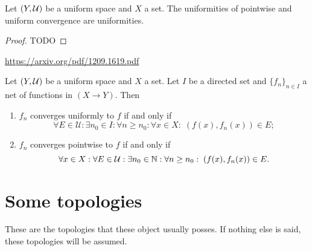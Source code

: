 \begin{lemma}
Let $\left( Y,\mathcal{U} \right)$ be a uniform space and $X$ a set. The uniformities of pointwise and uniform convergence are uniformities.
\end{lemma}
\begin{proof}
TODO
\end{proof}

\url{https://arxiv.org/pdf/1209.1619.pdf}

\begin{proposition}
Let $\left( Y,\mathcal{U} \right)$ be a uniform space and $X$ a set. Let $I$ be a directed set and $\{f_n\}_{n\in I}$ a net of functions in $(X\to Y)$. Then
\begin{enumerate}
\item $f_n$ converges uniformly to $f$ \textup{if and only if}
\[ \forall E\in\mathcal{U}: \exists n_0\in I: \forall n \geq n_0: \forall x\in X: \; (f(x), f_n(x)) \in E; \]
\item $f_n$ converges pointwise to $f$ \textup{if and only if}
\[ \forall x\in X: \forall E\in \mathcal{U}: \exists n_0\in \mathbb{N}: \forall n\geq n_0: \; (f(x), f_n(x)) \in E. \]
\end{enumerate}
\end{proposition}


\chapter{Some topologies}
These are the topologies that these object usually posses. If nothing else is said, these topologies will be assumed.

